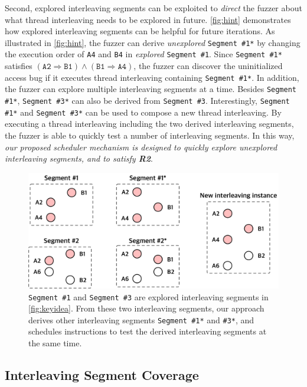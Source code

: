 Second, explored interleaving segments can be exploited to
\textit{direct} the fuzzer about what thread interleaving needs to be
explored in future.
%
\autoref{fig:hint} demonstrates how explored interleaving segments
can be helpful for future iterations.
%
As illustrated in \autoref{fig:hint}, the fuzzer can derive
\textit{unexplored} \texttt{Segment \#1*} by changing the execution
order of \texttt{A4} and \texttt{B4} in \textit{explored}
\texttt{Segment \#1}.
%
Since \texttt{Segment \#1*} satisfies
$(\texttt{A2} \Rightarrow \texttt{B1}) \wedge (\texttt{B1} \Rightarrow
\texttt{A4})$, the fuzzer can discover the uninitialized access bug if
it executes thread interleaving containing \texttt{Segment \#1*}.
%
In addition, the fuzzer can explore multiple interleaving segments at
a time.
%
Besides \texttt{Segment \#1*}, \texttt{Segment \#3*} can also be
derived from \texttt{Segment \#3}.
%
Interestingly, \texttt{Segment \#1*} and \texttt{Segment \#3*} can be
used to compose a new thread interleaving.
%
By executing a thread interleaving including the two derived
interleaving segments, the fuzzer is able to quickly test a number of
interleaving segments.
%
In this way, \textit{our proposed scheduler mechanism is designed to
  quickly explore unexplored interleaving segments, and to satisfy
  \textbf{R2}}.
%
\begin{figure}[t]
  \centering
  \includegraphics[width=0.9\linewidth]{fig/hint.pdf}
  \caption{\texttt{Segment \#1} and \texttt{Segment \#3} are explored
    interleaving segments in \autoref{fig:keyidea}.
    From these two interleaving segments, our approach derives other
    interleaving segments \texttt{Segment \#1*} and \texttt{\#3*}, and
    schedules instructions to test the derived interleaving segments
    at the same time.}
  \label{fig:hint}
\end{figure}
%



\subsection{Interleaving Segment Coverage}
\label{ss:coverage}

